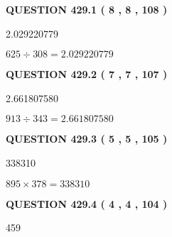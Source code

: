 \documentclass{ctexart}
\begin{document}
{\textbf{\Large{QUESTION
429.1 
 ( 8 , 8 , 108 )
}}}
  
  
 
 
\noindent{}

2.029220779
 
 
 
 
\noindent{}

$ %
625 \div  %
308=   %
2.029220779$
 
 
  
\vspace{0.2in}
  
{\textbf{\Large{QUESTION
429.2 
 ( 7 , 7 , 107 )
}}}
  
  
 
 
\noindent{}

2.661807580
 
 
 
 
\noindent{}

$ %
913 \div  %
343=   %
2.661807580$
 
 
  
\vspace{0.2in}
  
{\textbf{\Large{QUESTION
429.3 
 ( 5 , 5 , 105 )
}}}
  
  
 
 
\noindent{}

338310
 
 
 
 
\noindent{}

$ %
895 \times  %
378=   %
338310$
 
 
  
\vspace{0.2in}
  
{\textbf{\Large{QUESTION
429.4 
 ( 4 , 4 , 104 )
}}}
  
  
 
 
\noindent{}

459
 
 
 
 
\noindent{}
\end{document}
